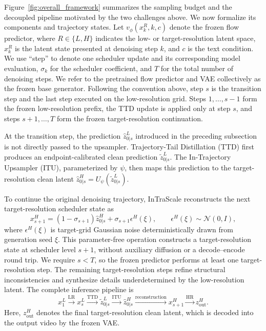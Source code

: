 \documentclass[letterpaper]{article} %
\begin{document}
Figure~\ref{fig:overall_framework} summarizes the sampling budget and the
decoupled pipeline motivated by the two challenges above. We now formalize
its components and trajectory states.
Let \(v_\phi(x_k^R,k,c)\) denote the frozen flow predictor, where
\(R\in\{L,H\}\) indicates the low- or target-resolution latent space,
\(x_k^R\) is the latent state presented at denoising step \(k\), and \(c\) is
the text condition. We use ``step'' to denote one scheduler update and its
corresponding model evaluation, \(\sigma_k\) for the scheduler coefficient, and
\(T\) for the total number of denoising steps.
We refer to the pretrained flow predictor and VAE collectively as the frozen
base generator. Following the convention above, step \(s\) is the
transition step and the last step executed on the low-resolution
grid. Steps \(1,\ldots,s-1\) form the frozen low-resolution prefix, the
TTD update is applied only at step \(s\), and steps
\(s+1,\ldots,T\) form the frozen target-resolution continuation.

At the transition step, the prediction
\(\widehat{z}_{0|s}^{L}\) introduced in the preceding subsection is not
directly passed to the upsampler. Trajectory-Tail Distillation
(TTD) first produces an endpoint-calibrated clean prediction
\(\widetilde{z}_{0|s}^{L}\). The In-Trajectory Upsampler (ITU), parameterized
by \(\psi\), then maps this prediction to the target-resolution clean latent
\(\widehat{z}_{0|s}^{H}=U_\psi(\widetilde{z}_{0|s}^{L})\).

To continue the original denoising trajectory, InTraScale reconstructs the
next target-resolution scheduler state as
\[
x_{s+1}^{H}
=
(1-\sigma_{s+1})\widehat{z}_{0|s}^{H}
+
\sigma_{s+1}\epsilon^{H}(\xi),
\qquad
\epsilon^{H}(\xi)\sim\mathcal{N}(0,I),
\]
  where \(\epsilon^{H}(\xi)\) is target-grid Gaussian noise deterministically
  drawn from generation seed \(\xi\). This parameter-free operation
constructs a target-resolution state at scheduler level \(s+1\), without
auxiliary diffusion or a decode--encode round trip. We require
\(s<T\), so the frozen predictor performs at least one target-resolution
step. The remaining target-resolution steps refine structural
inconsistencies and synthesize details underdetermined by the low-resolution
latent. The complete inference pipeline is
\[
x_1^{L}
\xrightarrow{\text{LR}}
x_s^{L}
\xrightarrow{\text{TTD}}
\widetilde{z}_{0|s}^{L}
\xrightarrow{\text{ITU}}
\widehat{z}_{0|s}^{H}
\xrightarrow{\text{reconstruction}}
x_{s+1}^{H}
\xrightarrow{\text{HR}}
z_{\mathrm{out}}^{H}.
\]
Here, \(z_{\mathrm{out}}^{H}\) denotes the final target-resolution clean latent,
which is decoded into the output video by the frozen VAE.
\end{document}
